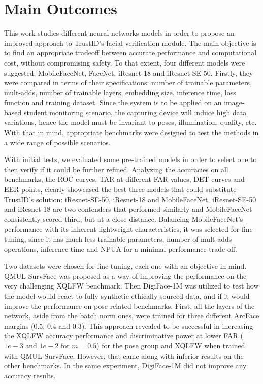 \documentclass[class=report, crop=false, a4paper, 12pt]{standalone}
\begin{document}
\section{Main Outcomes}
\par This work studies different neural networks models in order to propose an improved approach to TrustID's facial verification module. The main objective is to find an appropriate tradeoff between accurate performance and computational cost, without compromising safety. To that extent, four different models were suggested: MobileFaceNet, FaceNet, iResnet-18 and iResnet-SE-50. Firstly, they were compared in terms of their specifications: number of trainable parameters, mult-adds, number of trainable layers, embedding size, inference time, loss function and training dataset. Since the system is to be applied on an image-based student monitoring scenario, the capturing device will induce high data variations, hence the model must be invariant to poses, illumination, quality, etc. With that in mind, appropriate benchmarks were designed to test the methods in a wide range of possible scenarios.

\par With initial tests, we evaluated some pre-trained models in order to select one to then verify if it could be further refined. Analyzing the accuracies on all benchmarks, the ROC curves, TAR at different FAR values, DET curves and EER points, clearly showcased the best three models that could substitute TrustID's solution: iResnet-SE-50, iResnet-18 and MobileFaceNet. iResnet-SE-50 and iResnet-18 are two contenders that performed similarly and MobileFaceNet consistently scored third, but at a close distance. Balancing MobileFaceNet's performance with its inherent lightweight characteristics, it was selected for fine-tuning, since it has much less trainable parameters, number of mult-adds operations, inference time and NPUA for a minimal performance trade-off.

\par Two datasets were chosen for fine-tuning, each one with an objective in mind. QMUL-SurvFace was proposed as a way of improving the performance on the very challenging XQLFW benchmark. Then DigiFace-1M was utilized to test how the model would react to fully synthetic ethically sourced data, and if it would improve the performance on pose related benchmarks. First, all the layers of the network, aside from the batch norm ones, were trained for three different ArcFace margins ($0.5$, $0.4$ and $0.3$). This approach revealed to be successful in increasing the XQLFW accuracy performance and discriminative power at lower FAR ($1e-3$ and $1e-2$ for $m=0.5$) for the pose group and XQLFW when trained with QMUL-SurvFace. However, that came along with inferior results on the other benchmarks. In the same experiment, DigiFace-1M did not improve any accuracy results.  
\end{document}
